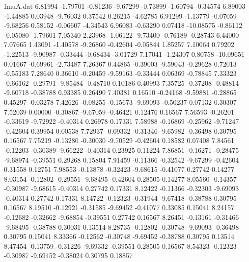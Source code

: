 \begin{filecontents}{ImuA.dat}
   6.81994   -1.79701   -0.81236   -9.67299   -0.73899   -1.60794   -0.34574
   6.89003   -1.44885    0.03948   -9.76032    0.37542    0.26215   -4.62785
   6.91299   -1.13779   -0.07059   -9.68256    0.58152   -0.06607   -4.34543
   6.96083   -0.63290    0.07418  -10.08575   -0.86112   -0.05080   -1.79601
   7.05340    2.23968   -1.06122   -9.73400   -0.76189   -0.28743    6.44000
   7.07665    1.43091   -1.40578   -9.26860   -0.42604   -0.05844    1.85257
   7.10064    0.79202   -1.22513   -9.90987   -0.33444   -0.68434   -3.01729
   7.17041   -1.24307    0.80758  -10.09651    0.01667   -0.69961   -2.73487
   7.26367    0.44865   -0.39003   -9.59043   -0.29628    0.72013   -0.55183
   7.28640    0.36610   -0.20459   -9.59163   -0.33444    0.06369   -0.78845
   7.33323   -0.66162   -0.29791   -9.85484   -0.48710    0.10186    0.40993
   7.35725   -0.37208   -0.48814   -9.60718   -0.38788    0.93385    0.26490
   7.40381    0.16510   -0.24168   -9.59881   -0.28865    0.45297   -0.03278
   7.42626   -0.08255   -0.15673   -9.69093   -0.50237    0.07132    0.30307
   7.52039    0.00000   -0.30867   -9.67059   -0.46421    0.12476    0.16567
   7.56593   -0.26201   -0.33619   -9.72922   -0.40314    0.26978    0.17331
   7.58988   -0.16869   -0.25962   -9.71247   -0.42604    0.39954    0.00538
   7.72937   -0.09332   -0.31346   -9.65982   -0.36498    0.30795    0.16567
   7.75219   -0.13280   -0.30030   -9.70529   -0.42604    0.18582    0.07408
   7.84561   -0.12203   -0.30389   -9.66222   -0.40314    0.23925    0.11224
   7.86851   -0.16271   -0.28475   -9.68974   -0.39551    0.29268    0.15804
   7.91459   -0.11366   -0.32542   -9.67299   -0.42604    0.31558    0.12751
   7.98553   -0.13878   -0.32423   -9.68615   -0.41077    0.27742    0.14277
   8.03154   -0.12802   -0.29551   -9.68495   -0.42604    0.28505    0.14277
   8.05560   -0.14357   -0.30987   -9.68615   -0.40314    0.27742    0.17331
   8.12422   -0.11366   -0.32303   -9.69093   -0.40314    0.27742    0.17331
   8.14722   -0.12323   -0.31944   -9.67418   -0.38788    0.30795    0.16567
   8.19510   -0.12921   -0.31585   -9.69452   -0.41077    0.33085    0.15041
   8.24157   -0.12682   -0.32662   -9.68854   -0.39551    0.27742    0.16567
   8.26451   -0.13161   -0.31466   -9.68495   -0.38788    0.30031    0.13514
   8.28735   -0.12802   -0.30748   -9.69093   -0.36498    0.30795    0.15041
   8.33366   -0.12562   -0.30748   -9.69452   -0.38788    0.30795    0.13514
   8.47454   -0.13759   -0.31226   -9.69332   -0.39551    0.28505    0.16567
   8.54323   -0.12323   -0.30987   -9.69452   -0.38024    0.30795    0.18857

\end{filecontents}
